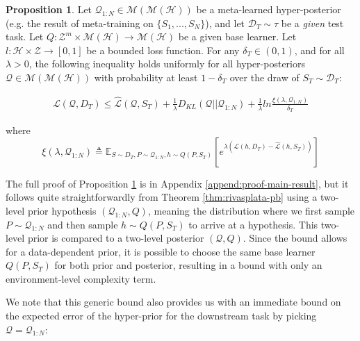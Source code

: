 \documentclass{article}
\theoremstyle{definition}
\newtheorem{proposition}{Proposition}[section]
\newcommand{\Expect}[2]{\mathbb{E}_{#1}\left [#2 \right ]}
\begin{document}
\begin{proposition} \label{thm:main-result}
	Let $\mathcal{Q}_{1:N}\in \mathcal{M}(\mathcal{M}(\mathcal{H}))$ be a meta-learned hyper-posterior (e.g. the result of meta-training on $\{S_1,...,S_N\}$), and let $\mathcal{D}_T\sim \tau$ be a \emph{given} test task. Let $Q: \mathcal{Z}^m\times\mathcal{M}(\mathcal{H})\rightarrow \mathcal{M}(\mathcal{H})$ be a given base learner. Let $l: \mathcal{H}\times \mathcal{Z}\rightarrow [0, 1]$ be a bounded loss function.
	For any $\delta_T \in (0,1)$, and for all $\lambda>0$, the following inequality holds uniformly for all hyper-posteriors $\mathcal{Q}\in \mathcal{M}(\mathcal{M}(\mathcal{H}))$ with probability at least $1-\delta_T$ over the draw of $S_T\sim \mathcal{D}_T$:
	
	\begin{align} \label{eq:main-result-generic}
	\mathcal{L}(\mathcal{Q}, D_T) \leq \hat{\mathcal{L}}(\mathcal{Q}, S_T) + \frac{1}{\lambda}D_{KL}(\mathcal{Q}||\mathcal{Q}_{1:N})
	+\frac{1}{\lambda}ln\frac{\xi(\lambda,\mathcal{Q}_{1:N})}{\delta_T}
	\end{align}
	
	
	where 
	$$\xi(\lambda,\mathcal{Q}_{1:N})\triangleq \Expect{S\sim D_T, P\sim \mathcal{Q}_{1:N}, h\sim Q(P,S_T)}{e^{\lambda\left (\mathcal{L}(h, D_T)-\hat{\mathcal{L}}(h, S_T)\right )}}$$
\end{proposition}

The full proof of Proposition \ref{thm:main-result} is in Appendix \ref{append:proof-main-result}, but it follows quite straightforwardly from Theorem \ref{thm:rivasplata-pb} using a two-level prior hypothesis $(\mathcal{Q}_{1:N}, Q)$, meaning the distribution where we first sample $P\sim \mathcal{Q}_{1:N}$ and then sample $h\sim Q(P, S_T)$ to arrive at a hypothesis. This two-level prior is compared to a two-level posterior $(\mathcal{Q}, Q)$. Since the bound allows for a data-dependent prior, it is possible to choose the same base learner $Q(P, S_T)$ for both prior and posterior, resulting in a bound with only an environment-level complexity term.

We note that this generic bound also provides us with an immediate bound on the expected error of the hyper-prior for the downstream task by picking $\mathcal{Q}=\mathcal{Q}_{1:N}$:
\end{document}
